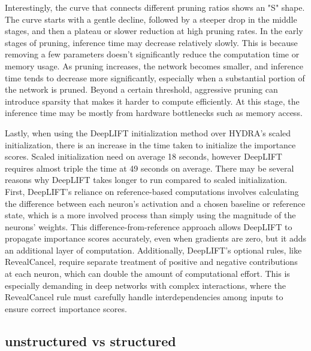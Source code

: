 \documentclass[journal,onecolumn,12pt]{IEEEtran}
\begin{document}
Interestingly, the curve that connects different pruning ratios shows an "S" shape. The curve starts with a gentle decline, followed by a steeper drop in the middle stages, and then a plateau or slower reduction at high pruning rates. In the early stages of pruning, inference time may decrease relatively slowly. This is because removing a few parameters doesn't significantly reduce the computation time or memory usage. As pruning increases, the network becomes smaller, and inference time tends to decrease more significantly, especially when a substantial portion of the network is pruned. Beyond a certain threshold, aggressive pruning can introduce sparsity that makes it harder to compute efficiently. At this stage, the inference time may be mostly from hardware bottlenecks such as memory access.

Lastly, when using the DeepLIFT initialization method over HYDRA's scaled initialization, there is an increase in the time taken to initialize the importance scores. Scaled initialization need on average 18 seconds, however DeepLIFT requires almost triple the time at 49 seconds on average. There may be several reasons why DeepLIFT takes longer to run compared to scaled initialization. First, DeepLIFT’s reliance on reference-based computations involves calculating the difference between each neuron’s activation and a chosen baseline or reference state, which is a more involved process than simply using the magnitude of the neurons' weights. This difference-from-reference approach allows DeepLIFT to propagate importance scores accurately, even when gradients are zero, but it adds an additional layer of computation. Additionally, DeepLIFT’s optional rules, like RevealCancel, require separate treatment of positive and negative contributions at each neuron, which can double the amount of computational effort. This is especially demanding in deep networks with complex interactions, where the RevealCancel rule must carefully handle interdependencies among inputs to ensure correct importance scores. 


\subsection{unstructured vs structured}
\end{document}
